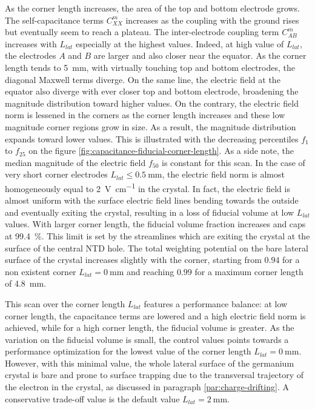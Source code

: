 As the corner length increases, the area of the top and bottom electrode grows. The self-capacitance terms $C_{XX}^m$ increases as the coupling with the ground rises but eventually seem to reach a plateau. The inter-electrode coupling term $C_{AB}^m$ increases with $L_{lat}$ especially at the highest values. Indeed, at high value of $L_{lat}$, the electrodes $A$ and $B$ are larger and also closer near the equator. As the corner length tends to \SI{5}{\mm}, with virtually touching top and bottom electrodes, the diagonal Maxwell terms diverge. On the same line, the electric field at the equator also diverge with ever closer top and bottom electrode, broadening the magnitude distribution toward higher values.
On the contrary, the electric field norm is lessened in the corners as the corner length increases and these low magnitude corner regions grow in size. As a result, the magnitude distribution expands toward lower values. This is illustrated with the decreasing percentiles $f_1$ to $f_{25}$ on the figure \ref{fig:capacitance-fiducial-corner-length}. As a side note, the median magnitude of the electric field $f_{50}$ is constant for this scan. In the case of very short corner electrodes $L_{lat} \leq \SI{0.5}{\mm}$, the electric field norm is almost homogeneously equal to \SI{2}{\volt\per\cm} in the crystal.
In fact, the electric field is almost uniform with the surface electric field lines bending towards the outside and eventually exiting the crystal, resulting in a loss of fiducial volume at low $L_{lat}$ values. With larger corner length, the fiducial volume fraction increases and caps at \SI{99.4}{\percent}. This limit is set by the streamlines which are exiting the crystal at the surface of the central NTD hole.
The total weighting potential on the bare lateral surface of the crystal increases slightly with the corner, starting from $0.94$ for a non existent corner $L_{lat}=\SI{0}{\mm}$ and reaching $0.99$ for a maximum corner length of \SI{4.8}{\mm}.   

This scan over the corner length $L_{lat}$ features a performance balance: at low corner length, the capacitance terms are lowered and a high electric field norm is achieved, while for a high corner length, the fiducial volume is greater. As the variation on the fiducial volume is small, the control values points towards a performance optimization for the lowest value of the corner length $L_{lat}=\SI{0}{\mm}$. However, with this minimal value, the whole lateral surface of the germanium crystal is bare and prone to surface trapping due to the transversal trajectory of the electron in the crystal, as discussed in paragraph \ref{par:charge-drifting}. A conservative trade-off value is the default value $L_{lat}=\SI{2}{\mm}$.

